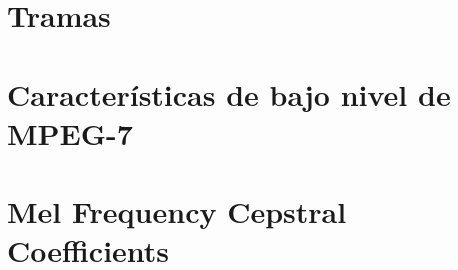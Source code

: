 \section{Tramas}\label{sec:frames}


\section{Características de bajo nivel de MPEG-7}\label{sec:mpeg7}


%
%
%
%
%

\section{Mel Frequency Cepstral Coefficients}\label{sec:MFCC}

